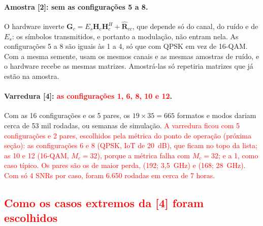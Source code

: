 \documentclass[11pt]{article}
\newcommand{\novo}[1]{\textcolor{red}{#1}}
\begin{document}
\paragraph{Amostra [2]: sem as configurações 5 a 8.} O hardware inverte
$\mathbf G_c = E_s \mathbf H_c \mathbf H_c^H + \hat{\mathbf R}_{cc}$, que depende só do canal,
do ruído e de $E_s$: os símbolos transmitidos, e portanto a modulação, não entram nela. As
configurações 5 a 8 são iguais às 1 a 4, só que com QPSK em vez de 16-QAM. Com
a mesma semente, usam os mesmos canais e as mesmas amostras de ruído, e o hardware recebe as
mesmas matrizes. Amostrá-las só repetiria matrizes que já estão na amostra.

\paragraph{Varredura [4]: \novo{as configurações 1, 6, 8, 10 e 12}.} Com as 16 configurações e os 5 pares,
os $19 \times 35 = 665$ formatos e modos dariam cerca de 53 mil rodadas, ou semanas de
simulação. \novo{A varredura ficou com 5 configurações e 2 pares, escolhidos pela métrica do
ponto de operação (próxima seção): as configurações 6 e 8 (QPSK, IoT de 20~dB), que ficam no
topo da lista; as 10 e 12 (16-QAM, $M_c = 32$), porque a métrica falha com $M_c = 32$; e a 1,
como caso típico. Os pares são os de maior perda, (192; 3,5~GHz) e (168; 28~GHz). Com só 4 SNRs
por caso, foram 6.650 rodadas em cerca de 7 horas.}

\subsection*{\novo{Como os casos extremos da [4] foram escolhidos}}
\end{document}
